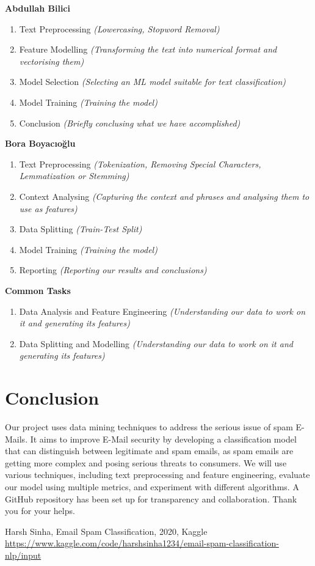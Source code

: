 \documentclass[conference]{IEEEtran}
\begin{document}
\textbf{Abdullah Bilici}
\begin{enumerate}
    \item Text Preprocessing \textit{(Lowercasing, Stopword Removal)}
    \item Feature Modelling \textit{(Transforming the text into numerical format and vectorising them)}
    \item Model Selection \textit{(Selecting an ML model suitable for text classification)}
    \item Model Training \textit{(Training the model)}
    \item Conclusion \textit{(Briefly conclusing what we have accomplished)}
\end{enumerate}

\textbf{Bora Boyacıoğlu}
\begin{enumerate}
    \item Text Preprocessing \textit{(Tokenization, Removing Special Characters, Lemmatization or Stemming)}
    \item Context Analysing \textit{(Capturing the context and phrases and analysing them to use as features)}
    \item Data Splitting \textit{(Train-Test Split)}
    \item Model Training \textit{(Training the model)}
    \item Reporting \textit{(Reporting our results and conclusions)}
\end{enumerate}

\textbf{Common Tasks}
\begin{enumerate}
    \item Data Analysis and Feature Engineering \textit{(Understanding our data to work on it and generating its features)}
    \item Data Splitting and Modelling \textit{(Understanding our data to work on it and generating its features)}
\end{enumerate}

\section{Conclusion}
Our project uses data mining techniques to address the serious issue of spam E-Mails. It aims to improve E-Mail security by developing a classification model that can distinguish between legitimate and spam emails, as spam emails are getting more complex and posing serious threats to consumers. We will use various techniques, including text preprocessing and feature engineering, evaluate our model using multiple metrics, and experiment with different algorithms. A GitHub repository has been set up for transparency and collaboration. Thank you for your helps.

\begin{thebibliography}{00}
 Harsh Sinha, Email Spam Classification, 2020, Kaggle\\{\tiny\href{https://www.kaggle.com/code/harshsinha1234/email-spam-classification-nlp/input}{https://www.kaggle.com/code/harshsinha1234/email-spam-classification-nlp/input}}
\end{thebibliography}
\end{document}
